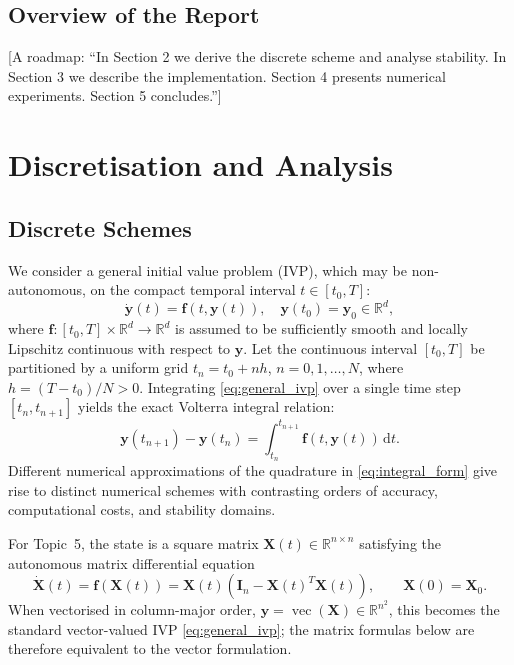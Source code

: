 \documentclass[11pt,a4paper]{article}
\theoremstyle{definition}
\theoremstyle{remark}
\begin{document}
\subsection{Overview of the Report}
[A roadmap: ``In Section 2 we derive the discrete scheme and analyse stability.
In Section 3 we describe the implementation. Section 4 presents numerical
experiments. Section 5 concludes.'']

\newpage
\section{Discretisation and Analysis}

\subsection{Discrete Schemes}
\label{sec:discrete_schemes}

We consider a general initial value problem (IVP), which may be non-autonomous, on the compact temporal interval $t \in [t_0, T]$:
\begin{equation}
\label{eq:general_ivp}
\dot{\mathbf{y}}(t) = \mathbf{f}(t, \mathbf{y}(t)), \quad \mathbf{y}(t_0) = \mathbf{y}_0 \in \mathbb{R}^d,
\end{equation}
where $\mathbf{f}: [t_0, T] \times \mathbb{R}^d \to \mathbb{R}^d$ is assumed to be sufficiently smooth and locally Lipschitz continuous with respect to $\mathbf{y}$. Let the continuous interval $[t_0, T]$ be partitioned by a uniform grid
$t_n=t_0+nh$, $n=0,1,\ldots,N$, where $h=(T-t_0)/N>0$. Integrating \eqref{eq:general_ivp} over a single time step $[t_n,t_{n+1}]$ yields the exact Volterra integral relation:
\begin{equation}
\label{eq:integral_form}
\mathbf{y}(t_{n+1}) - \mathbf{y}(t_n) = \int_{t_n}^{t_{n+1}} \mathbf{f}(t, \mathbf{y}(t)) \, \mathrm{d}t.
\end{equation}
Different numerical approximations of the quadrature in \eqref{eq:integral_form} give rise to distinct numerical schemes with contrasting orders of accuracy, computational costs, and stability domains.

For Topic~5, the state is a square matrix
$\mathbf{X}(t)\in\mathbb{R}^{n\times n}$ satisfying the autonomous
matrix differential equation
\begin{equation}
\label{eq:topic5_matrix_model}
\dot{\mathbf{X}}(t)
=
\mathbf{f}(\mathbf{X}(t))
=
\mathbf{X}(t)\left(\mathbf{I}_n-\mathbf{X}(t)^T\mathbf{X}(t)\right),
\qquad
\mathbf{X}(0)=\mathbf{X}_0.
\end{equation}
When vectorised in column-major order,
$\mathbf{y}=\operatorname{vec}(\mathbf{X})\in\mathbb{R}^{n^2}$,
this becomes the standard vector-valued IVP \eqref{eq:general_ivp}; the
matrix formulas below are therefore equivalent to the vector formulation.
\end{document}
